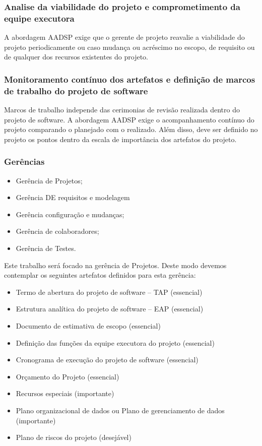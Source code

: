 \documentclass{acm_proc_article-sp}
\begin{document}
\subsubsection*{Analise da viabilidade do projeto e comprometimento da equipe executora}
A abordagem AADSP exige que o gerente de projeto reavalie a viabilidade do projeto periodicamente ou caso mudança ou acréscimo no escopo, de requisito ou de qualquer dos recursos existentes do projeto\cite{aadsp:hibirdo}.

\subsubsection*{Monitoramento contínuo dos artefatos e definição de marcos de trabalho do projeto de software}
Marcos de trabalho independe das cerimonias de revisão realizada dentro do projeto de software.  A abordagem AADSP exige o acompanhamento contínuo do projeto comparando o planejado com o realizado. Além disso, deve ser definido no projeto os pontos dentro da escala de importância dos artefatos do projeto. 

\subsubsection*{Gerências}

\begin{itemize}
\item Gerência de Projetos;
\item Gerência DE requisitos e modelagem
\item Gerência configuração e mudanças;
\item Gerência de colaboradores;
\item Gerência de Testes.
\end{itemize}

Este trabalho será focado na gerência de Projetos. Deste modo devemos contemplar os seguintes artefatos definidos para esta gerência:

\begin{itemize}
\item Termo de abertura do  projeto de software – TAP (essencial)
\item Estrutura analítica do projeto de software – EAP (essencial)
\item Documento de estimativa de escopo (essencial)
\item Definição das funções da equipe executora do projeto (essencial)
\item Cronograma de execução do projeto de software (essencial)
\item Orçamento do Projeto (essencial)
\item Recursos especiais (importante)
\item Plano organizacional de dados ou Plano de gerenciamento de dados  (importante)
\item Plano de riscos do projeto (desejável)
\end{itemize}
\end{document}
